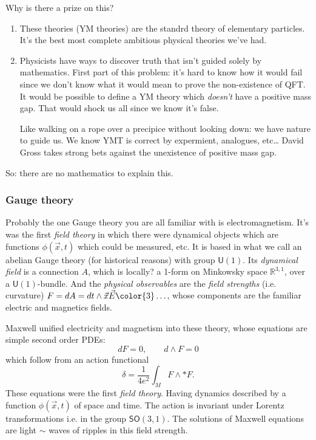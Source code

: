 Why is there a prize on this?
\begin{enumerate}
\item These theories (YM theories) are the standrd theory of elementary
particles. It's the best most complete ambitious physical theories we've had.
\item Physicists have ways to discover truth that isn't guided solely by
mathematics. First part of this problem: it's hard to know how it would fail
since we don't know what it would mean to prove the non-existence of QFT. It
would be possible to define a YM theory which \textit{doesn't} have a positive
mass gap. That would shock us all since we know it's false.

 Like walking on a rope over a precipice without looking down: we have nature to
 guide us. We know YMT is correct by expermient, analogues, etc… David Gross
 takes strong bets against the unexistence of positive mass gap.
\end{enumerate}
So: there are no mathematics to explain this.

\subsubsection{Gauge theory}

Probably the one Gauge theory you are all familiar with is electromagnetism.
It's was the first \textit{field theory} in which there were dynamical objects
which are functions $\phi(\vec{x},t)$ which could be measured, etc. It is based
in what we call an abelian Gauge theory (for historical reasons) with group
$\mathsf{U}(1)$. Its \textit{dynamical field} is a connection $A$, which is
{\color{4}locally?} a 1-form on Minkowsky space $\mathbb{R}^{3,1}$, over a
$\mathsf{U}(1)$-bundle. And the \textit{physical observables} are the
\textit{field strengths} (i.e. curvature) $F=dA=dt\wedge \vec{x}
\vec{E}{\color{3}\ldots}$, whose components are the familiar electric and
magnetics fields.

Maxwell unified electricity and magnetism into these theory, whose equations are
simple second order PDEs:
\[dF=0,\qquad d\wedge F=0\]
which follow from an action functional
\[\delta=\frac{1}{4e^2}\int_{M}F\wedge * F.\]
These equations were the first \textit{field theory}. Having dynamics described
by a function $\phi(\vec{x},t)$ of space and time. The action is invariant under
Lorentz transformations i.e. in the group $\mathsf{SO}(3,1)$. The solutions of
Maxwell equations are light $\sim$ waves of ripples in this field strength.

